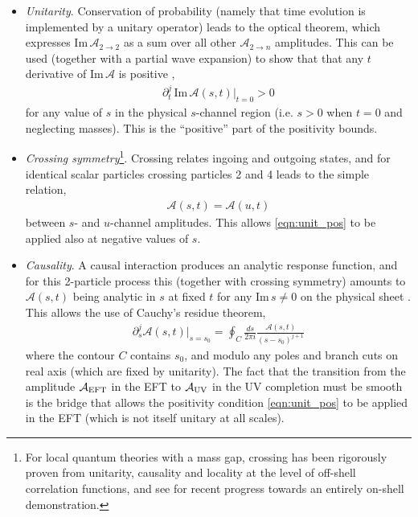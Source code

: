 \documentclass[11pt]{article}
\begin{document}
\begin{itemize}

\item \emph{Unitarity}. Conservation of probability (namely that time evolution is implemented by a unitary operator) leads to the optical theorem, which expresses $\text{Im} \, \mathcal{A}_{2 \to 2}$ as a sum over all other $\mathcal{A}_{2 \to n}$ amplitudes. This can be used (together with a partial wave expansion) to show that that any $t$ derivative of $\text{Im} \, \mathcal{A}$ is positive \cite{Nicolis:2009qm},
\begin{align}
\partial_t^j \,  \text{Im} \, \mathcal{A} (s,t) |_{t=0} > 0 
\label{eqn:unit_pos}
\end{align}
for any value of $s$ in the physical $s$-channel region (i.e. $s>0$ when $t=0$ and neglecting masses). This is the ``positive'' part of the positivity bounds.

\item \emph{Crossing symmetry}\footnote{
For local quantum theories with a mass gap, crossing has been rigorously proven from unitarity, causality and locality at the level of off-shell correlation functions, and see \cite{Mizera:2021ujs, Mizera:2021fap} for recent progress towards an entirely on-shell demonstration.
}. 
Crossing relates ingoing and outgoing states, and for identical scalar particles crossing particles 2 and 4 leads to the simple relation,
\begin{align}
\mathcal{A} (s,t) = \mathcal{A} (u , t)
\label{eqn:crossing}
\end{align}
between $s$- and $u$-channel amplitudes. This allows \eqref{eqn:unit_pos} to be applied also at negative values of $s$.  

\item \emph{Causality}.
A causal interaction produces an analytic response function, and for this 2-particle process this (together with crossing symmetry) amounts to $\mathcal{A} (s,t)$ being analytic in $s$ at fixed $t$ for any $\text{Im} \, s \neq 0$ on the physical sheet \cite{bogoliubov1959introduction, Hepp_1964, Bros:1964iho, Bremermann:1958zz, Martin:1965jj}. This allows the use of Cauchy's residue theorem,  
\begin{align}
\partial_s^j \mathcal{A} (s ,t) |_{s=s_0}  = \oint_C \frac{ds}{2 \pi i} \frac{ \mathcal{A} (s, t) }{ (s-s_0)^{j+1} }
\label{eqn:anal}
\end{align}
where the contour $C$ contains $s_0$, and modulo any poles and branch cuts on real axis (which are fixed by unitarity). The fact that the transition from the amplitude $\mathcal{A}_{\rm EFT}$ in the EFT to $\mathcal{A}_{\rm UV}$ in the UV completion must be smooth is the bridge that allows the positivity condition \eqref{eqn:unit_pos} to be applied in the EFT (which is not itself unitary at all scales). 


\end{itemize}
\end{document}
